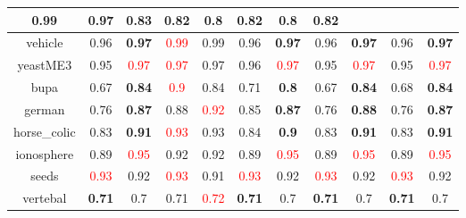 \documentclass{article}%
\begin{document}
\begin{tabular}{c|cccccccccc}
{0.99
}&0.97&\textbf{0.83}&0.82&0.8&\textbf{0.82}&0.8&\textbf{0.82}\\%
\hline%
vehicle&0.96&\textbf{0.97}&\textcolor{red}{ 
0.99
}&0.99&0.96&\textbf{0.97}&0.96&\textbf{0.97}&0.96&\textbf{0.97}\\%
\hline%
yeastME3&0.95&\textcolor{red}{ 
0.97
}&\textcolor{red}{ 
0.97
}&0.97&0.96&\textcolor{red}{ 
0.97
}&0.95&\textcolor{red}{ 
0.97
}&0.95&\textcolor{red}{ 
0.97
}\\%
\hline%
bupa&0.67&\textbf{0.84}&\textcolor{red}{ 
0.9
}&0.84&0.71&\textbf{0.8}&0.67&\textbf{0.84}&0.68&\textbf{0.84}\\%
\hline%
german&0.76&\textbf{0.87}&0.88&\textcolor{red}{ 
0.92
}&0.85&\textbf{0.87}&0.76&\textbf{0.88}&0.76&\textbf{0.87}\\%
\hline%
horse\_colic&0.83&\textbf{0.91}&\textcolor{red}{ 
0.93
}&0.93&0.84&\textbf{0.9}&0.83&\textbf{0.91}&0.83&\textbf{0.91}\\%
\hline%
ionosphere&0.89&\textcolor{red}{ 
0.95
}&0.92&0.92&0.89&\textcolor{red}{ 
0.95
}&0.89&\textcolor{red}{ 
0.95
}&0.89&\textcolor{red}{ 
0.95
}\\%
\hline%
seeds&\textcolor{red}{ 
0.93
}&0.92&\textcolor{red}{ 
0.93
}&0.91&\textcolor{red}{ 
0.93
}&0.92&\textcolor{red}{ 
0.93
}&0.92&\textcolor{red}{ 
0.93
}&0.92\\%
\hline%
vertebal&\textbf{0.71}&0.7&0.71&\textcolor{red}{ 
0.72
}&\textbf{0.71}&0.7&\textbf{0.71}&0.7&\textbf{0.71}&0.7\\%
\hline%
\end{tabular}

%
\end{document}

